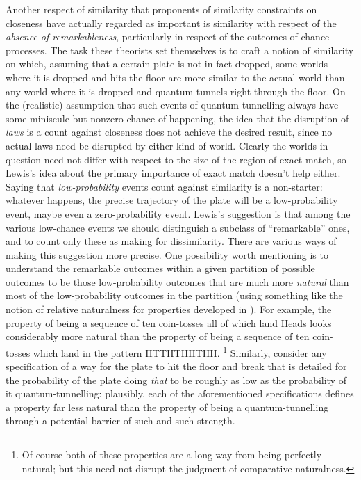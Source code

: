 \documentclass[leqno, 11pt, a5paper, openany]{article}
\begin{document}
Another respect of similarity that proponents of similarity constraints on closeness have actually regarded as important is similarity with respect of the \emph{absence of remarkableness}, particularly in respect of the outcomes of chance processes. The task these theorists set themselves is to craft a notion of similarity on which, assuming that a certain plate is not in fact dropped, some worlds where it is dropped and hits the floor are more similar to the actual world than any world where it is dropped and quantum-tunnels right through the floor. On the (realistic) assumption that such events of quantum-tunnelling always have some miniscule but nonzero chance of happening, the idea that the disruption of \emph{laws} is a count against closeness does not achieve the desired result, since no actual laws need be disrupted by either kind of world. Clearly the worlds in question need not differ with respect to the size of the region of exact match, so Lewis's idea about the primary importance of exact match doesn't help either. Saying that \emph{low-probability} events count against similarity is a non-starter: whatever happens, the precise trajectory of the plate will be a low-probability event, maybe even a zero-probability event. Lewis's suggestion is that among the various low-chance events we should distinguish a subclass of “remarkable” ones, and to count only these as making for dissimilarity. There are various ways of making this suggestion more precise. One possibility worth mentioning is to understand the remarkable outcomes within a given partition of possible outcomes to be those low-probability outcomes that are much more \emph{natural} than most of the low-probability outcomes in the partition (using something like the notion of relative naturalness for properties developed in \cite{LewisNWTU}). For example, the property of being a sequence of ten coin-tosses all of which land Heads looks considerably more natural than the property of being a sequence of ten coin-tosses which land in the pattern HTTHTHHTHH.%
\footnote{Of course both of these properties are a long way from being perfectly natural; but this need not disrupt the judgment of comparative naturalness.} 
Similarly, consider any specification of a way for the plate to hit the floor and break that is detailed for the probability of the plate doing \emph{that} to be roughly as low as the probability of it quantum-tunnelling: plausibly, each of the aforementioned specifications defines a property far less natural than the property of being a quantum-tunnelling through a potential barrier of such-and-such strength.%
\end{document}
